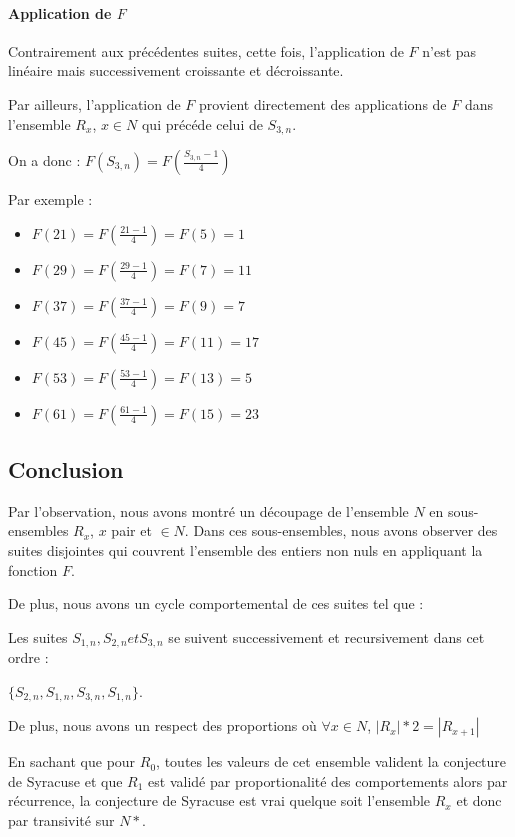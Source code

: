 \documentclass{book}
\begin{document}
\paragraph{Application de $F$}

Contrairement aux pr\'ec\'edentes suites, cette fois, l'application de $F$ n'est pas lin\'eaire mais successivement croissante et d\'ecroissante.

Par ailleurs, l'application de $F$ provient directement des applications de $F$ dans l'ensemble $R_x$, $x \in N$ qui pr\'ec\'ede celui de $S_{3,n}$.

On a donc : $F(S_{3,n}) = F(\frac{S_{3,n} - 1}{4})$

Par exemple :

\begin{itemize}
	\item $F(21) = F(\frac{21 - 1}{4}) = F(5) = 1$
	\item $F(29) = F(\frac{29 - 1}{4}) = F(7) = 11$
	\item $F(37) = F(\frac{37 - 1}{4}) = F(9) = 7$
	\item $F(45) = F(\frac{45 - 1}{4}) = F(11) = 17$
	\item $F(53) = F(\frac{53 - 1}{4}) = F(13) = 5$
	\item $F(61) = F(\frac{61 - 1}{4}) = F(15) = 23$
\end{itemize}

\subsection{Conclusion}

Par l'observation, nous avons montr\'e un d\'ecoupage de l'ensemble $N$ en sous-ensembles $R_x$, $x$ pair et $\in N$.
Dans ces sous-ensembles, nous avons observer des suites disjointes qui couvrent l'ensemble des entiers non nuls en appliquant la fonction $F$.

De plus, nous avons un cycle comportemental de ces suites tel que :

Les suites $S_{1,n}, S_{2,n} et S_{3,n}$ se suivent successivement et recursivement dans cet ordre :

$\{S_{2,n}, S_{1,n}, S_{3,n}, S_{1,n}\}$.

De plus, nous avons un respect des proportions o\`u $\forall x \in N$, $|R_x| * 2 = |R_{x+1}|$

En sachant que pour $R_0$, toutes les valeurs de cet ensemble valident la conjecture de Syracuse et que $R_1$ est valid\'e par proportionalit\'e des comportements alors par r\'ecurrence, la conjecture de Syracuse est vrai quelque soit l'ensemble $R_x$ et donc par transivit\'e sur $N*$.

\label{end}
\end{document}
